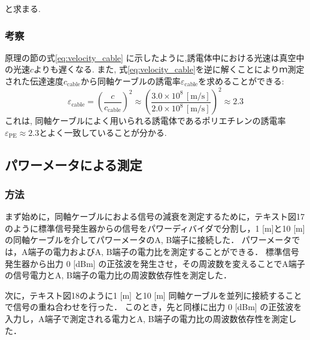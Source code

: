 \documentclass[uplatex,dvipdfmx,a4j,12pt]{jsarticle}
\begin{document}
と求まる.







\subsubsection{考察}


原理の節の式\eqref{eq:velocity_cable} に示したように,誘電体中における光速は真空中の光速$c$よりも遅くなる.
また, 式\eqref{eq:velocity_cable}を逆に解くことによりｍ測定された伝達速度$c_\mathrm{cable}$から同軸ケーブルの誘電率$\varepsilon_\mathrm{cable}$を求めることができる:
\begin{equation}
  \varepsilon_\mathrm{cable} = \left(\frac{c}{c_\mathrm{cable}}\right)^2 \approx \left(\frac{3.0 \times 10^8\,\mathrm{[m/s]}}{2.0 \times 10^8\,\mathrm{[m/s]}}\right)^2 \approx 2.3
\end{equation}
これは, 同軸ケーブルによく用いられる誘電体であるポリエチレンの誘電率$\varepsilon_\mathrm{PE} \approx 2.3$とよく一致していることが分かる.



\subsection{パワーメータによる測定}
\subsubsection{方法}
まず始めに，同軸ケーブルにおよる信号の減衰を測定するために，テキスト図17のように標準信号発生器からの信号をパワーディバイダで分割し，1 [m]と10 [m]の同軸ケーブルを介してパワーメータのA, B端子に接続した．
パワーメータでは，A端子の電力およびA, B端子の電力比を測定することができる．
標準信号発生器から出力 0 [dBm] の正弦波を発生させ，その周波数を変えることでA端子の信号電力とA, B端子の電力比の周波数依存性を測定した．

次に，テキスト図18のように1 [m] と10 [m] 同軸ケーブルを並列に接続することで信号の重ね合わせを行った．
このとき，先と同様に出力 0 [dBm] の正弦波を入力し，A端子で測定される電力とA, B端子の電力比の周波数依存性を測定した．
\end{document}

